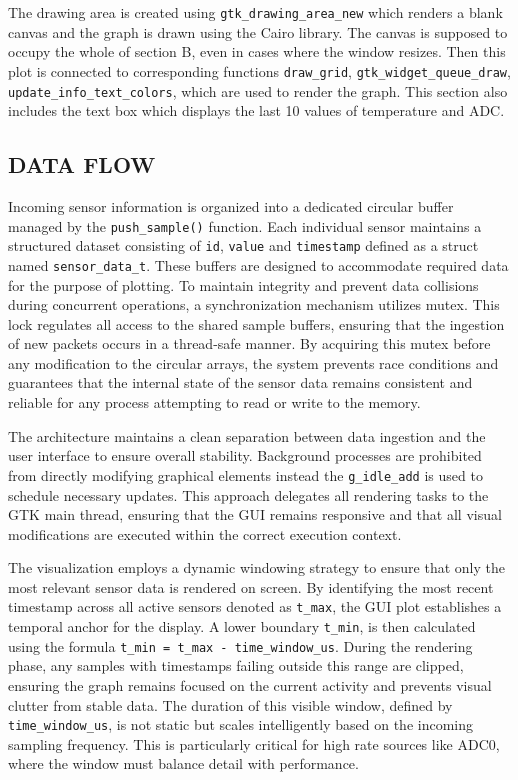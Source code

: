 The drawing area is created using \texttt{gtk\_drawing\_area\_new} which renders a blank canvas and the graph is drawn using the Cairo library. The canvas is supposed to occupy the whole of section B, even in cases where the window resizes. Then this plot is connected to corresponding functions \texttt{draw\_grid}, \texttt{gtk\_widget\_queue\_draw}, \texttt{update\_info\_text\_colors}, which are used to render the graph. This section also includes the text box which displays the last 10 values of temperature and ADC.

\subsection{DATA FLOW}
Incoming sensor information is organized into a dedicated circular buffer managed by the \texttt{push\_sample()} function. Each individual sensor maintains a structured dataset consisting of \texttt{id}, \texttt{value} and \texttt{timestamp} defined as a struct named \texttt{sensor\_data\_t}. These buffers are designed to accommodate required data for the purpose of plotting. To maintain integrity and prevent data collisions during concurrent operations, a synchronization mechanism utilizes mutex. This lock regulates all access to the shared sample buffers, ensuring that the ingestion of new packets occurs in a thread-safe manner. By acquiring this mutex before any modification to the circular arrays, the system prevents race conditions and guarantees that the internal state of the sensor data remains consistent and reliable for any process attempting to read or write to the memory.

The architecture maintains a clean separation between data ingestion and the user interface to ensure overall stability. Background processes are prohibited from directly modifying graphical elements instead the \texttt{g\_idle\_add} is used to schedule necessary updates. This approach delegates all rendering tasks to the GTK main thread, ensuring that the GUI remains responsive and that all visual modifications are executed within the correct execution context.

The visualization employs a dynamic windowing strategy to ensure that only the most relevant sensor data is rendered on screen. By identifying the most recent timestamp across all active sensors denoted as \texttt{t\_max}, the GUI plot establishes a temporal anchor for the display. A lower boundary \texttt{t\_min}, is then calculated using the formula \texttt{t\_min = t\_max - time\_window\_us}. During the rendering phase, any samples with timestamps failing outside this range are clipped, ensuring the graph remains focused on the current activity and prevents visual clutter from stable data. The duration of this visible window, defined by \texttt{time\_window\_us}, is not static but scales intelligently based on the incoming sampling frequency. This is particularly critical for high rate sources like ADC0, where the window must balance detail with performance.

